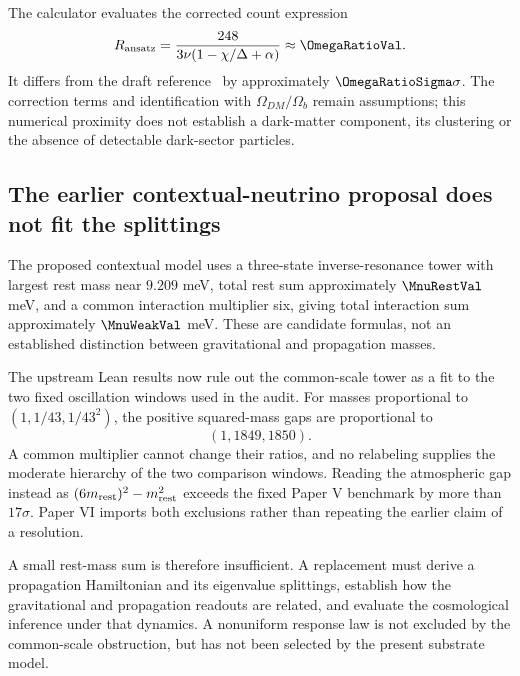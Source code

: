 The calculator evaluates the corrected count expression
\begin{equation}
R_{\rm ansatz}=\frac{248}{3\nu(1-\chi/\Delta+\alpha)}
\approx\OmegaRatioVal.
\end{equation}
It differs from the draft reference \OmegaRatioExperimentalValue\ by approximately $\OmegaRatioSigma\sigma$. The correction terms and identification with $\Omega_{DM}/\Omega_b$ remain assumptions; this numerical proximity does not establish a dark-matter component, its clustering or the absence of detectable dark-sector particles.


\subsection{The earlier contextual-neutrino proposal does not fit the splittings}
The proposed contextual model uses a three-state inverse-resonance tower with largest rest mass near $9.209$ meV, total rest sum approximately $\MnuRestVal$ meV, and a common interaction multiplier six, giving total interaction sum approximately $\MnuWeakVal$ meV. These are candidate formulas, not an established distinction between gravitational and propagation masses.

The upstream Lean results now rule out the common-scale tower as a fit to the two fixed oscillation windows used in the audit. For masses proportional to $(1,1/43,1/43^2)$, the positive squared-mass gaps are proportional to
\begin{equation}
(1,1849,1850).
\end{equation}
A common multiplier cannot change their ratios, and no relabeling supplies the moderate hierarchy of the two comparison windows. Reading the atmospheric gap instead as $(6m_{\rm rest})^2-m_{\rm rest}^2$ exceeds the fixed Paper V benchmark by more than $17\sigma$. Paper VI imports both exclusions rather than repeating the earlier claim of a resolution.

A small rest-mass sum is therefore insufficient. A replacement must derive a propagation Hamiltonian and its eigenvalue splittings, establish how the gravitational and propagation readouts are related, and evaluate the cosmological inference under that dynamics. A nonuniform response law is not excluded by the common-scale obstruction, but has not been selected by the present substrate model.
